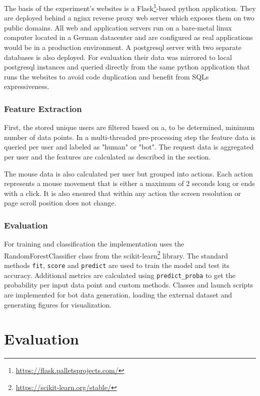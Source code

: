 \documentclass[
    fontsize=12pt,
    headings=small,
    parskip=half,           %
    bibliography=totoc,
    numbers=noenddot,       %
    open=any,               %
    final,                   %
    table
]{scrreprt}
\begin{document}
The basis of the experiment's websites is a Flask\footnote{\url{https://flask.palletsprojects.com/}}-based python application. They are deployed behind a nginx reverse proxy web server which exposes them on two public domains. All web and application servers run on a bare-metal linux computer located in a German datacenter and are configured as real applications would be in a production environment. A postgresql server with two separate databases is also deployed. For evaluation their data was mirrored to local postgresql instances and queried directly from the same python application that runs the websites to avoid code duplication and benefit from SQLs expressiveness.

\subsection{Feature Extraction}

First, the stored unique users are filtered based on a, to be determined, minimum number of data points. In a multi-threaded pre-processing step the feature data is queried per user and labeled as "human" or "bot". The request data is aggregated per user and the features are calculated as described in the  section.

The mouse data is also calculated per user but grouped into actions. Each action represents a mouse movement that is either a maximum of $2$ seconds long or ends with a click. It is also ensured that within any action the screen resolution or page scroll position does not change.

\subsection{Evaluation}

For training and classification the implementation uses the RandomForestClassifier class from the scikit-learn\footnote{\url{https://scikit-learn.org/stable/}} library. The standard methods \lstinline{fit}, \lstinline{score} and \lstinline{predict} are used to train the model and test its accuracy. Additional metrics are calculated using \lstinline{predict_proba} to get the probability per input data point and custom methods. Classes and launch scripts are implemented for bot data generation, loading the external dataset and generating figures for visualization.


\chapter{Evaluation}
\end{document}
